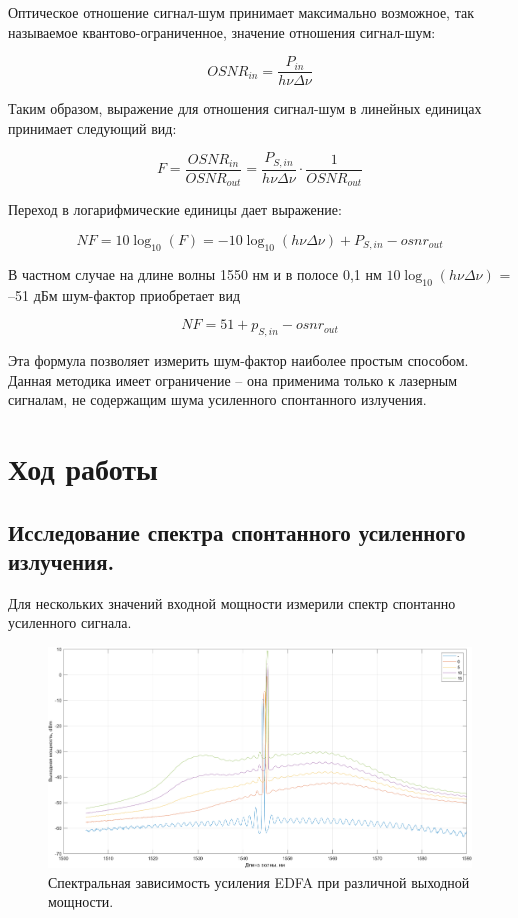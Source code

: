\documentclass[12pt,a4paper]{article}
\begin{document}
Оптическое отношение сигнал-шум принимает максимально возможное, так называемое квантово-ограниченное, значение отношения сигнал-шум:

\begin{equation*}
    OSNR_{in} = \frac{P_{in}}{h\nu\Delta \nu}
\end{equation*}

Таким образом, выражение для отношения сигнал-шум в линейных
единицах принимает следующий вид:

\begin{equation*}
    F = \frac{OSNR_{in}}{OSNR_{out}} = \frac{P_{S,in}}{h\nu\Delta \nu} \cdot \frac{1}{OSNR_{out}}
\end{equation*}

Переход в логарифмические единицы дает выражение:

\begin{equation*}
    NF = 10\log_{10}(F) = -10\log_{10}(h\nu\Delta \nu) + P_{S,in} - osnr_{out}
\end{equation*}

В частном случае на длине волны 1550 нм и в полосе 0,1 нм $10\log_{10}(h\nu\Delta \nu)$ = –51 дБм шум-фактор приобретает вид

\begin{equation*}
    NF = 51 + p_{S,in} - osnr_{out}
\end{equation*}

Эта формула позволяет измерить шум-фактор наиболее простым способом. Данная методика имеет ограничение – она применима только к лазерным сигналам, не содержащим шума усиленного спонтанного излучения.


\newpage
\section{Ход работы}

\subsection{Исследование спектра спонтанного усиленного
излучения.}

Для нескольких значений входной мощности измерили спектр спонтанно усиленного сигнала.

\begin{figure}[h!]
		\centering
		\includegraphics[width=0.99\linewidth]{point1.png}
		\caption{Спектральная зависимость усиления EDFA при различной выходной мощности.}
		\label{labC}
	\end{figure}
\end{document}

